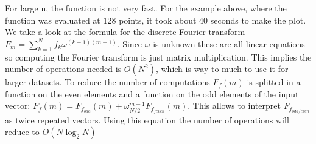 \documentclass[12pt]{article}
\begin{document}
For large n, the function is not very fast. For the example above, where the function was evaluated at $128$ points, it took about 40 seconds to make the plot. We take a look at the formula for the discrete Fourier transform $F_m = \sum_{k=1}^{N}f_k\omega^{(k-1)(m-1)}$. Since $\omega$ is unknown these are all linear equations so computing the Fourier transform is just matrix multiplication. This implies the number of operations needed is $O(N^2)$, which is way to much to use it for larger datasets. To reduce the number of computations $F_f(m)$ is splitted in a function on the even elements and a function on the odd elements of the input vector: $F_f(m) = F_{f_{odd}}(m) + \omega_{N/2}^{m-1}F_{f_{feven}}(m).$ This allows to interpret $F_{f_{odd/even}}$ as twice repeated vectors. Using this equation the number of operations will reduce to $O(N \log_2 N)$


\end{document}
